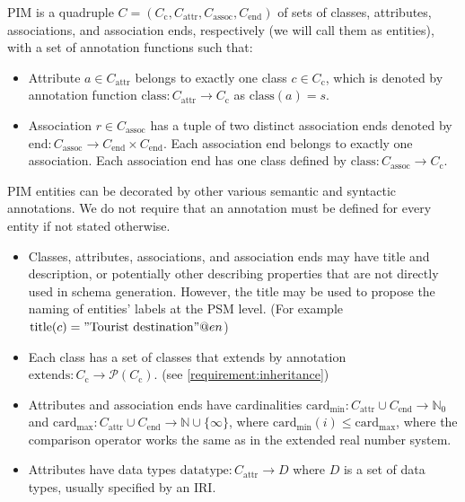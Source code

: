 \begin{definition}[PIM] PIM is a quadruple $C=(C_\textrm{c}, C_\textrm{attr}, C_\textrm{assoc}, C_\textrm{end})$ of sets of classes, attributes, associations, and association ends, respectively (we will call them as entities), with a set of annotation functions such that:
    \begin{itemize}
        \item Attribute $a \in C_\textrm{attr}$ belongs to exactly one class $c \in C_\textrm{c}$, which is denoted by annotation function $\textrm{class}: C_\textrm{attr} \rightarrow C_\textrm{c}$ as $\textrm{class}(a)=s$.
        \item Association $r \in C_\textrm{assoc}$ has a tuple of two distinct association ends denoted by $\textrm{end}: C_\textrm{assoc} \rightarrow C_\textrm{end}\times C_\textrm{end}$. Each association end belongs to exactly one association. Each association end has one class defined by $\textrm{class}: C_\textrm{assoc} \rightarrow C_\textrm{c}$.
    \end{itemize}

    PIM entities can be decorated by other various semantic and syntactic annotations. We do not require that an annotation must be defined for every entity if not stated otherwise.

    \begin{itemize}
        \item Classes, attributes, associations, and association ends may have title and description, or potentially other describing properties that are not directly used in schema generation. However, the title may be used to propose the naming of entities' labels at the PSM level. (For example $\textrm{title}(c)="\textrm{Tourist destination}"@en$)
        \item Each class has a set of classes that extends by annotation $\textrm{extends}: C_\textrm{c} \rightarrow \mathcal{P}(C_\textrm{c})$. (see \autoref{requirement:inheritance})
        \item Attributes and association ends have cardinalities $\textrm{card}_{\textrm{min}}: C_\textrm{attr} \cup C_\textrm{end} \rightarrow \mathds{N}_0$ and $\textrm{card}_{\textrm{max}}: C_\textrm{attr} \cup C_\textrm{end} \rightarrow \mathds{N} \cup \{\infty\}$, where $\textrm{card}_{\textrm{min}}(i) \leq \textrm{card}_{\textrm{max}}$, where the comparison operator works the same as in the extended real number system.
        \item Attributes have data types $\textrm{datatype}: C_\textrm{attr} \rightarrow D$ where $D$ is a set of data types, usually specified by an IRI.
    \end{itemize}
\end{definition}

